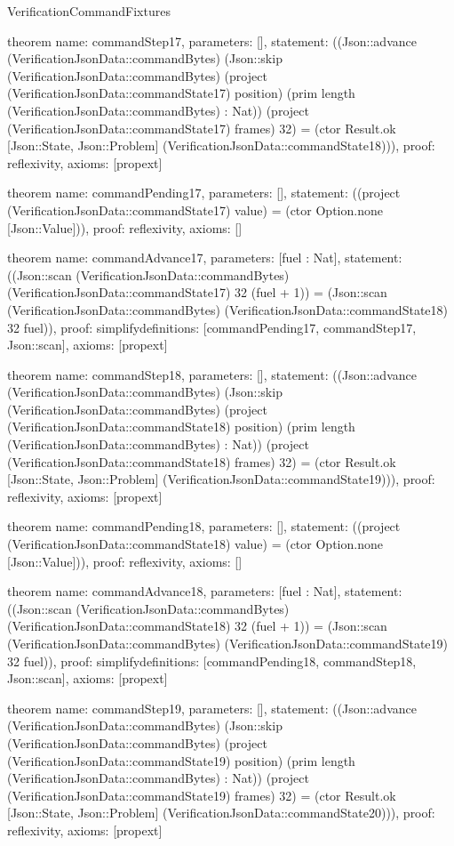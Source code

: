 \begin{lexlean}{VerificationCommandFixtures}
\begin{semanticmodule}
theorem{
  name: commandStep17,
  parameters: [],
  statement: ((Json::advance (VerificationJsonData::commandBytes) (Json::skip (VerificationJsonData::commandBytes) (project (VerificationJsonData::commandState17) position) (prim length (VerificationJsonData::commandBytes) : Nat)) (project (VerificationJsonData::commandState17) frames) 32) = (ctor Result.ok [Json::State, Json::Problem] (VerificationJsonData::commandState18))),
  proof: reflexivity{},
  axioms: [propext]
}

theorem{
  name: commandPending17,
  parameters: [],
  statement: ((project (VerificationJsonData::commandState17) value) = (ctor Option.none [Json::Value])),
  proof: reflexivity{},
  axioms: []
}

theorem{
  name: commandAdvance17,
  parameters: [fuel : Nat],
  statement: ((Json::scan (VerificationJsonData::commandBytes) (VerificationJsonData::commandState17) 32 (fuel + 1)) = (Json::scan (VerificationJsonData::commandBytes) (VerificationJsonData::commandState18) 32 fuel)),
  proof: simplify{definitions: [commandPending17, commandStep17, Json::scan]},
  axioms: [propext]
}

theorem{
  name: commandStep18,
  parameters: [],
  statement: ((Json::advance (VerificationJsonData::commandBytes) (Json::skip (VerificationJsonData::commandBytes) (project (VerificationJsonData::commandState18) position) (prim length (VerificationJsonData::commandBytes) : Nat)) (project (VerificationJsonData::commandState18) frames) 32) = (ctor Result.ok [Json::State, Json::Problem] (VerificationJsonData::commandState19))),
  proof: reflexivity{},
  axioms: [propext]
}

theorem{
  name: commandPending18,
  parameters: [],
  statement: ((project (VerificationJsonData::commandState18) value) = (ctor Option.none [Json::Value])),
  proof: reflexivity{},
  axioms: []
}

theorem{
  name: commandAdvance18,
  parameters: [fuel : Nat],
  statement: ((Json::scan (VerificationJsonData::commandBytes) (VerificationJsonData::commandState18) 32 (fuel + 1)) = (Json::scan (VerificationJsonData::commandBytes) (VerificationJsonData::commandState19) 32 fuel)),
  proof: simplify{definitions: [commandPending18, commandStep18, Json::scan]},
  axioms: [propext]
}

theorem{
  name: commandStep19,
  parameters: [],
  statement: ((Json::advance (VerificationJsonData::commandBytes) (Json::skip (VerificationJsonData::commandBytes) (project (VerificationJsonData::commandState19) position) (prim length (VerificationJsonData::commandBytes) : Nat)) (project (VerificationJsonData::commandState19) frames) 32) = (ctor Result.ok [Json::State, Json::Problem] (VerificationJsonData::commandState20))),
  proof: reflexivity{},
  axioms: [propext]
}


\end{semanticmodule}
\end{lexlean}
